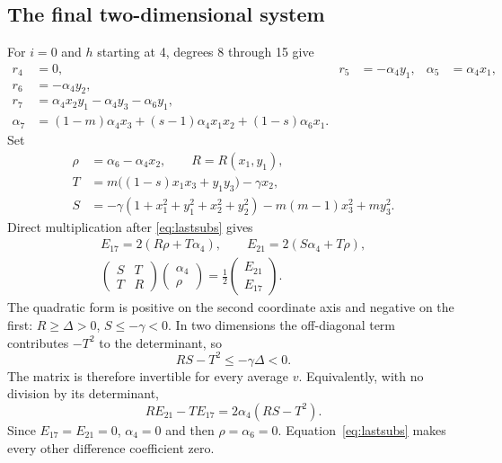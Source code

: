 \documentclass[11pt,a4paper]{article}
\begin{document}
\subsection{The final two-dimensional system}
For $i=0$ and $h$ starting at 4, degrees 8 through 15 give
\begin{equation}\label{eq:lastsubs}
\begin{aligned}
 r_4&=0,&r_5&=-\alpha_4y_1,&\alpha_5&=\alpha_4x_1,\\
 r_6&=-\alpha_4y_2,\\
 r_7&=\alpha_4x_2y_1-\alpha_4y_3-\alpha_6y_1,\\
 \alpha_7&=(1-m)\alpha_4x_3+(s-1)\alpha_4x_1x_2
                    +(1-s)\alpha_6x_1.
\end{aligned}
\end{equation}
Set
\begin{equation}\label{eq:RST}
\begin{aligned}
 \rho&=\alpha_6-\alpha_4x_2,\qquad R=R(x_1,y_1),\\
 T&=m\bigl((1-s)x_1x_3+y_1y_3\bigr)-\gamma x_2,\\
 S&=-\gamma(1+x_1^2+y_1^2+x_2^2+y_2^2)
       -m(m-1)x_3^2+my_3^2.
\end{aligned}
\end{equation}
Direct multiplication after \eqref{eq:lastsubs} gives
\begin{equation}\label{eq:matrix}
 \begin{gathered}
 E_{17}=2(R\rho+T\alpha_4),\qquad E_{21}=2(S\alpha_4+T\rho),\\
 \begin{pmatrix}S&T\\T&R\end{pmatrix}
 \begin{pmatrix}\alpha_4\\\rho\end{pmatrix}
 =\frac12\begin{pmatrix}E_{21}\\E_{17}\end{pmatrix}.
\end{gathered}
\end{equation}
The quadratic form is positive on the second coordinate axis and negative
on the first: $R\ge\Delta>0$, $S\le-\gamma<0$.
In two dimensions the off-diagonal term contributes $-T^2$ to the determinant,
so
\begin{equation}\label{eq:det}
 RS-T^2\le-\gamma\Delta<0.
\end{equation}
The matrix is therefore invertible for every average $v$.
Equivalently, with no division by its determinant,
\[
 R E_{21}-T E_{17}=2\alpha_4(RS-T^2).
\]
Since $E_{17}=E_{21}=0$, $\alpha_4=0$ and then $\rho=\alpha_6=0$.
Equation~\eqref{eq:lastsubs} makes every other difference coefficient zero.
\end{document}
